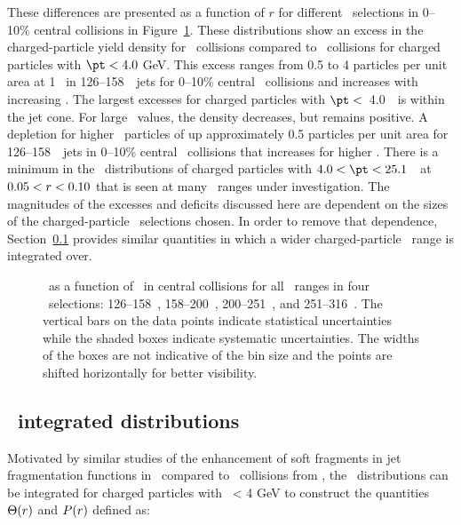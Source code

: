 These differences are presented as a function of $r$ for different \pt\ selections in 0--10\% central collisions in Figure~\ref{fig:deltadptr}. 
These distributions show an excess  in the charged-particle yield density for \pbpb\ collisions compared to \pp\ collisions for charged particles with $\pt <4.0$ GeV. This excess ranges from 0.5 to 4 particles per unit area at 1 \GeV\ in 126--158~\GeV\ jets for 0--10\% central \pbpb\ collisions and increases with increasing \ptjet. 
The largest excesses for charged particles with $\pt <$~4.0~\GeV\ is within the jet cone.  For large \rvar\ values, the
density decreases, but remains positive.
A depletion for higher \pt\ particles of up approximately 0.5 particles per unit area for 126--158~\GeV\ jets in 0--10\% central \pbpb\ collisions that increases for higher \ptjet. 
There is a minimum in the \DeltaDptr\ distributions of charged 
particles with \mbox{$ 4.0 < \pt <  25.1$}~\GeV\ at $0.05 < \mbox{$r$} < 0.10$ that is seen at many \ptjet\ ranges under investigation.
The magnitudes of the excesses and deficits discussed here are dependent on the sizes of the charged-particle \pt\ selections
chosen.  In order to remove that dependence, Section~\ref{sec:discussion_int} provides similar quantities in which a
wider charged-particle \pt\ range is integrated over.

\begin{figure}
   \caption{\DeltaDptr\ as a function of \rvar\ in central collisions for all \pt\ ranges in four \ptjet\ selections: 126--158~\GeV, 158--200~\GeV, 200--251~\GeV, and 251--316~\GeV. The vertical bars on the data points indicate statistical uncertainties while the shaded boxes indicate systematic uncertainties. The widths of the boxes are not indicative of the bin size and the points are shifted horizontally for better visibility. }
      \label{fig:deltadptr}
\end{figure}
\FloatBarrier

\subsection{\pt\ integrated distributions}
\label{sec:discussion_int}
Motivated by similar studies of the enhancement of soft fragments in 
jet fragmentation functions in \pbpb\ compared to \pp\ collisions from \cite{Aaboud:2018hpb}, the \Dptr\ distributions can be integrated for charged particles with \pt\ < 4 GeV to construct the quantities $\Theta(\mbox{$r$})$ and $P(\mbox{$r$})$ defined as:

